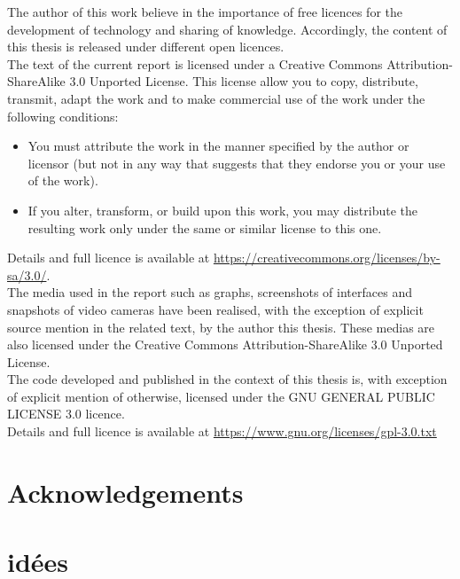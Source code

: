 The author of this work believe in the importance of free licences for the development of technology and sharing of knowledge.
Accordingly, the content of this thesis is released under different open licences.\\

The text of the current report is licensed under a Creative Commons Attribution-ShareAlike 3.0 Unported License.
This license allow you to copy, distribute, transmit, adapt the work and to make commercial use of the work under the following conditions:

\begin{itemize}
\item You must attribute the work in the manner specified by the author or licensor (but not in any way that suggests that they endorse you or your use of the work).
\item  If you alter, transform, or build upon this work, you may distribute the resulting work only under the same or similar license to this one. 
\end{itemize}

Details and full licence is available at \url{https://creativecommons.org/licenses/by-sa/3.0/}.\\

The media used in the report such as graphs, screenshots of interfaces and snapshots of video cameras have been realised, with the exception of explicit source mention in the related text, by the author this thesis.
These medias are also licensed under the Creative Commons Attribution-ShareAlike 3.0 Unported License.\\

The code developed and published in the context of this thesis is, with exception of explicit mention of otherwise, licensed under the GNU GENERAL PUBLIC LICENSE 3.0 licence.\\

Details and full licence is available at \url{https://www.gnu.org/licenses/gpl-3.0.txt}

\section{Acknowledgements}


\section{idées}

